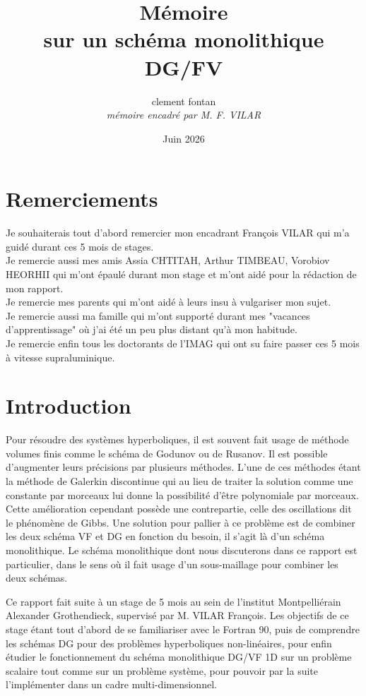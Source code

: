 \documentclass[16pt]{article}%
\title{  Mémoire \\
  \large sur un schéma monolithique DG/FV}
\author{clement fontan\\
\textit {mémoire encadré par M. F. VILAR}}
\date{Juin 2026}
\begin{document}
\maketitle
\tableofcontents
\section{Remerciements}
\noindent
Je souhaiterais tout d'abord remercier mon encadrant François VILAR qui m'a guidé durant ces 5 mois de stages. \\
Je remercie aussi mes amis Assia CHTITAH, Arthur TIMBEAU, Vorobiov HEORHII qui m'ont épaulé durant mon stage et m'ont aidé pour la rédaction de mon rapport.\\
Je remercie mes parents qui m'ont aidé à leurs insu à vulgariser mon sujet. \\
Je remercie aussi ma famille qui m'ont supporté durant mes "vacances d'apprentissage" où j'ai été un peu plus distant qu'à mon habitude. \\
Je remercie enfin tous les doctorants de l'IMAG qui ont su faire passer ces 5 mois à vitesse supraluminique.

\section{Introduction}

Pour résoudre des systèmes hyperboliques, il est souvent fait usage de méthode volumes finis comme le schéma de Godunov ou de Rusanov. 
Il est possible d'augmenter leurs précisions par plusieurs méthodes. 
L'une de ces méthodes étant la méthode de Galerkin discontinue qui au lieu de traiter la solution comme une constante par morceaux 
lui donne la possibilité d'être polynomiale par morceaux. Cette amélioration cependant possède une contrepartie, celle des oscillations dit le phénomène de Gibbs.
Une solution pour pallier à ce problème est de combiner les deux schéma VF et DG en fonction du besoin, il s'agit là d'un schéma monolithique. 
Le schéma monolithique dont nous discuterons dans ce rapport est particulier, dans le sens où il fait usage d'un sous-maillage pour combiner les deux schémas.

Ce rapport fait suite à un stage de 5 mois au sein de l'institut Montpelliérain Alexander Grothendieck, supervisé par M. VILAR François.
Les objectifs de ce stage étant tout d'abord de se familiariser avec le Fortran 90, 
puis de comprendre les schémas DG pour des problèmes hyperboliques non-linéaires, pour enfin
étudier le fonctionnement du schéma monolithique DG/VF 1D sur un problème scalaire tout comme sur un problème système,
pour pouvoir par la suite l'implémenter dans un cadre multi-dimensionnel.  \\
\end{document}
